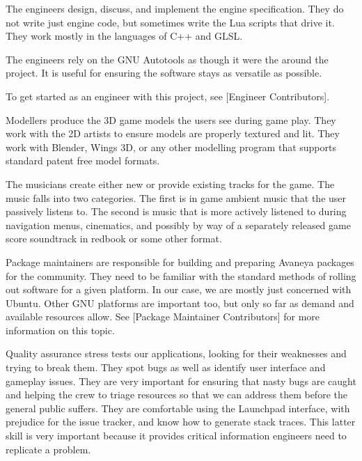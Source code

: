 
The engineers design, discuss, and implement the engine specification. They do not write just engine code, but sometimes write the Lua scripts that drive it. They work mostly in the languages of C++ and GLSL. 

The engineers rely on the GNU Autotools as though it were the  around the project. It is useful for ensuring the software stays as versatile as possible. 

To get started as an engineer with this project, see [Engineer Contributors].


Modellers produce the 3D game models the users see during game play. They work with the 2D artists to ensure models are properly textured and lit. They work with Blender, Wings 3D, or any other modelling program that supports standard patent free model formats.


The musicians create either new or provide existing tracks for the game. The music falls into two categories. The first is in game ambient music that the user passively listens to. The second is music that is more actively listened to during navigation menus, cinematics, and possibly by way of a separately released game score soundtrack in redbook or some other format.


Package maintainers are responsible for building and preparing Avaneya packages for the community. They need to be familiar with the standard methods of rolling out software for a given platform. In our case, we are mostly just concerned with Ubuntu. Other GNU platforms are important too, but only so far as demand and available resources allow. See [Package Maintainer Contributors] for more information on this topic.


Quality assurance stress tests our applications, looking for their weaknesses and trying to break them. They spot bugs as well as identify user interface and gameplay issues. They are very important for ensuring that nasty bugs are caught and helping the crew to triage resources so that we can address them before the general public suffers. They are comfortable using the Launchpad interface, with prejudice for the issue tracker, and know how to generate stack traces. This latter skill is very important because it provides critical information engineers need to replicate a problem.

